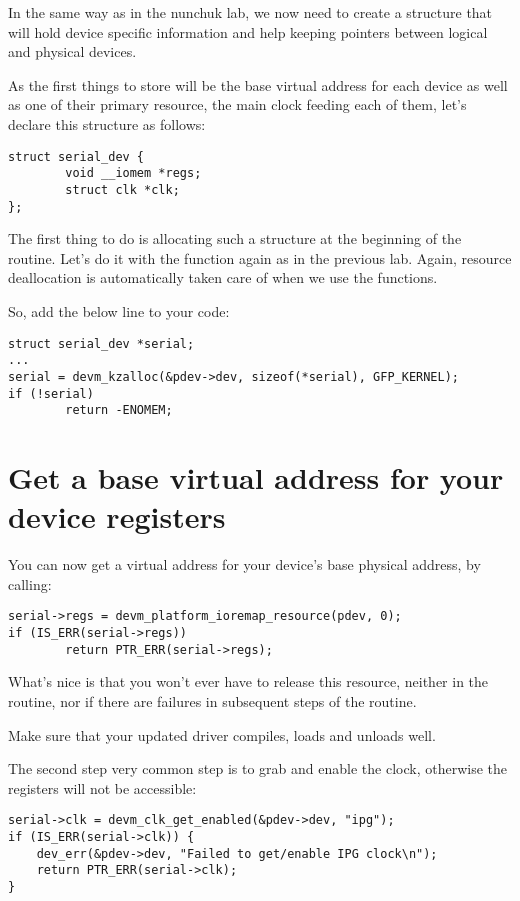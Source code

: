 In the same way as in the nunchuk lab, we now need to create a
structure that will hold device specific information and help
keeping pointers between logical and physical devices.

As the first things to store will be the base virtual address for
each device as well as one of their primary resource, the main clock feeding
each of them, let's declare this structure as follows:

\begin{verbatim}
struct serial_dev {
        void __iomem *regs;
        struct clk *clk;
};
\end{verbatim}

The first thing to do is allocating such a structure at the beginning
of the  routine. Let's do it with the 
function again as in the previous lab. Again, resource deallocation is
automatically taken care of when we use the  functions.

So, add the below line to your code:

\begin{verbatim}
struct serial_dev *serial;
...
serial = devm_kzalloc(&pdev->dev, sizeof(*serial), GFP_KERNEL);
if (!serial)
        return -ENOMEM;
\end{verbatim}

\section{Get a base virtual address for your device registers}

You can now get a virtual address for your device's base physical
address, by calling:

\begin{verbatim}
serial->regs = devm_platform_ioremap_resource(pdev, 0);
if (IS_ERR(serial->regs))
        return PTR_ERR(serial->regs);
\end{verbatim}

What's nice is that you won't ever have to release this resource,
neither in the  routine, nor if there are failures
in subsequent steps of the  routine.

Make sure that your updated driver compiles, loads and unloads well.

The second step very common step is to grab and enable the clock, otherwise the
registers will not be accessible:

\begin{verbatim}
serial->clk = devm_clk_get_enabled(&pdev->dev, "ipg");
if (IS_ERR(serial->clk)) {
	dev_err(&pdev->dev, "Failed to get/enable IPG clock\n");
	return PTR_ERR(serial->clk);
}
\end{verbatim}

